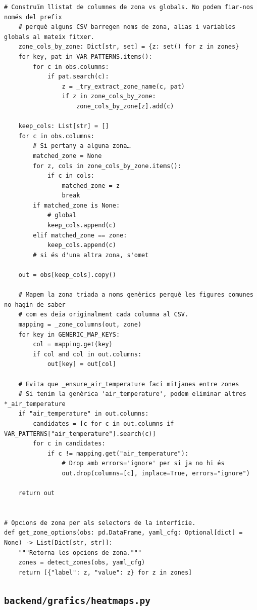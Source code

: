 \documentclass[10pt,a4paper]{article}
\begin{document}
\begin{lstlisting}[style=studioPython,caption={backend/grafics/figures\_zones.py},label={lst:backend-grafics-figures-zones-py}]
    # Construïm llistat de columnes de zona vs globals. No podem fiar-nos només del prefix
    # perquè alguns CSV barregen noms de zona, alias i variables globals al mateix fitxer.
    zone_cols_by_zone: Dict[str, set] = {z: set() for z in zones}
    for key, pat in VAR_PATTERNS.items():
        for c in obs.columns:
            if pat.search(c):
                z = _try_extract_zone_name(c, pat)
                if z in zone_cols_by_zone:
                    zone_cols_by_zone[z].add(c)

    keep_cols: List[str] = []
    for c in obs.columns:
        # Si pertany a alguna zona…
        matched_zone = None
        for z, cols in zone_cols_by_zone.items():
            if c in cols:
                matched_zone = z
                break
        if matched_zone is None:
            # global
            keep_cols.append(c)
        elif matched_zone == zone:
            keep_cols.append(c)
        # si és d'una altra zona, s'omet

    out = obs[keep_cols].copy()

    # Mapem la zona triada a noms genèrics perquè les figures comunes no hagin de saber
    # com es deia originalment cada columna al CSV.
    mapping = _zone_columns(out, zone)
    for key in GENERIC_MAP_KEYS:
        col = mapping.get(key)
        if col and col in out.columns:
            out[key] = out[col]

    # Evita que _ensure_air_temperature faci mitjanes entre zones
    # Si tenim la genèrica 'air_temperature', podem eliminar altres *_air_temperature
    if "air_temperature" in out.columns:
        candidates = [c for c in out.columns if VAR_PATTERNS["air_temperature"].search(c)]
        for c in candidates:
            if c != mapping.get("air_temperature"):
                # Drop amb errors='ignore' per si ja no hi és
                out.drop(columns=[c], inplace=True, errors="ignore")

    return out


# Opcions de zona per als selectors de la interfície.
def get_zone_options(obs: pd.DataFrame, yaml_cfg: Optional[dict] = None) -> List[Dict[str, str]]:
    """Retorna les opcions de zona."""
    zones = detect_zones(obs, yaml_cfg)
    return [{"label": z, "value": z} for z in zones]
\end{lstlisting}


\subsection{\texorpdfstring{\texttt{backend/grafics/heatmaps.py}}{backend/grafics/heatmaps.py}}
\end{document}
